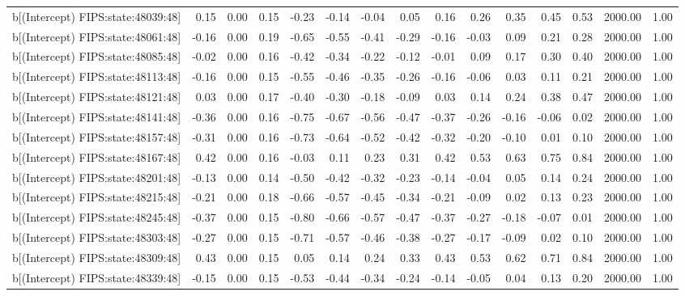 \begin{table}[ht]
\begin{tabular}{rrrrrrrrrrrrrrr}
  b[(Intercept) FIPS:state:48039:48] & 0.15 & 0.00 & 0.15 & -0.23 & -0.14 & -0.04 & 0.05 & 0.16 & 0.26 & 0.35 & 0.45 & 0.53 & 2000.00 & 1.00 \\ 
  b[(Intercept) FIPS:state:48061:48] & -0.16 & 0.00 & 0.19 & -0.65 & -0.55 & -0.41 & -0.29 & -0.16 & -0.03 & 0.09 & 0.21 & 0.28 & 2000.00 & 1.00 \\ 
  b[(Intercept) FIPS:state:48085:48] & -0.02 & 0.00 & 0.16 & -0.42 & -0.34 & -0.22 & -0.12 & -0.01 & 0.09 & 0.17 & 0.30 & 0.40 & 2000.00 & 1.00 \\ 
  b[(Intercept) FIPS:state:48113:48] & -0.16 & 0.00 & 0.15 & -0.55 & -0.46 & -0.35 & -0.26 & -0.16 & -0.06 & 0.03 & 0.11 & 0.21 & 2000.00 & 1.00 \\ 
  b[(Intercept) FIPS:state:48121:48] & 0.03 & 0.00 & 0.17 & -0.40 & -0.30 & -0.18 & -0.09 & 0.03 & 0.14 & 0.24 & 0.38 & 0.47 & 2000.00 & 1.00 \\ 
  b[(Intercept) FIPS:state:48141:48] & -0.36 & 0.00 & 0.16 & -0.75 & -0.67 & -0.56 & -0.47 & -0.37 & -0.26 & -0.16 & -0.06 & 0.02 & 2000.00 & 1.00 \\ 
  b[(Intercept) FIPS:state:48157:48] & -0.31 & 0.00 & 0.16 & -0.73 & -0.64 & -0.52 & -0.42 & -0.32 & -0.20 & -0.10 & 0.01 & 0.10 & 2000.00 & 1.00 \\ 
  b[(Intercept) FIPS:state:48167:48] & 0.42 & 0.00 & 0.16 & -0.03 & 0.11 & 0.23 & 0.31 & 0.42 & 0.53 & 0.63 & 0.75 & 0.84 & 2000.00 & 1.00 \\ 
  b[(Intercept) FIPS:state:48201:48] & -0.13 & 0.00 & 0.14 & -0.50 & -0.42 & -0.32 & -0.23 & -0.14 & -0.04 & 0.05 & 0.14 & 0.24 & 2000.00 & 1.00 \\ 
  b[(Intercept) FIPS:state:48215:48] & -0.21 & 0.00 & 0.18 & -0.66 & -0.57 & -0.45 & -0.34 & -0.21 & -0.09 & 0.02 & 0.13 & 0.23 & 2000.00 & 1.00 \\ 
  b[(Intercept) FIPS:state:48245:48] & -0.37 & 0.00 & 0.15 & -0.80 & -0.66 & -0.57 & -0.47 & -0.37 & -0.27 & -0.18 & -0.07 & 0.01 & 2000.00 & 1.00 \\ 
  b[(Intercept) FIPS:state:48303:48] & -0.27 & 0.00 & 0.15 & -0.71 & -0.57 & -0.46 & -0.38 & -0.27 & -0.17 & -0.09 & 0.02 & 0.10 & 2000.00 & 1.00 \\ 
  b[(Intercept) FIPS:state:48309:48] & 0.43 & 0.00 & 0.15 & 0.05 & 0.14 & 0.24 & 0.33 & 0.43 & 0.53 & 0.62 & 0.71 & 0.84 & 2000.00 & 1.00 \\ 
  b[(Intercept) FIPS:state:48339:48] & -0.15 & 0.00 & 0.15 & -0.53 & -0.44 & -0.34 & -0.24 & -0.14 & -0.05 & 0.04 & 0.13 & 0.20 & 2000.00 & 1.00 \\ 

\end{tabular}
\end{table}
